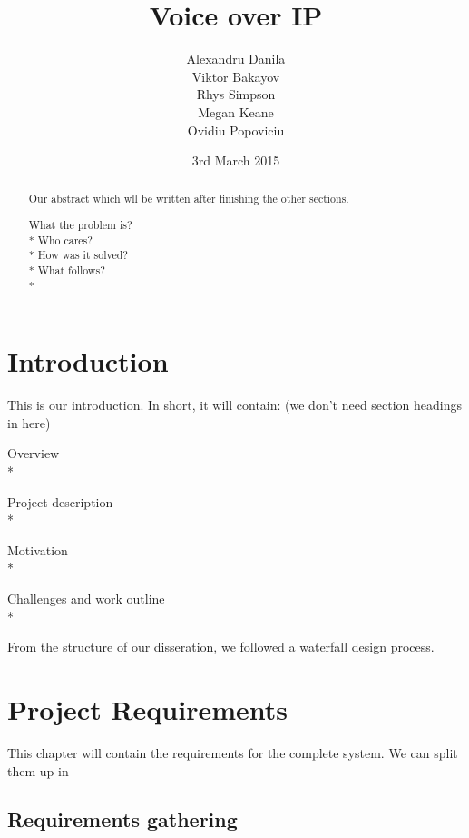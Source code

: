 \documentclass{l3proj}
\begin{document}
\title{Voice over IP}
\author{Alexandru Danila \\
        Viktor Bakayov \\
        Rhys Simpson \\
        Megan Keane \\
        Ovidiu Popoviciu}
\date{3rd March 2015}
\maketitle
\begin{abstract}

Our abstract which wll be written after finishing the other sections.

What the problem is?\\*
Who cares?\\*
How was it solved?\\*
What follows?\\*


\end{abstract}
\educationalconsent
\tableofcontents
\chapter{Introduction}
\label{intro}

This is our introduction. In short, it will contain: (we don't need section headings in here)

Overview\\*

Project description\\*

Motivation\\*

Challenges and work outline\\*


From the structure of our disseration, we followed a waterfall design process.


\chapter{Project Requirements}
\label{requirements}

This chapter will contain the requirements for the complete system. We can split them up in 

\section{Requirements gathering}
\end{document}
